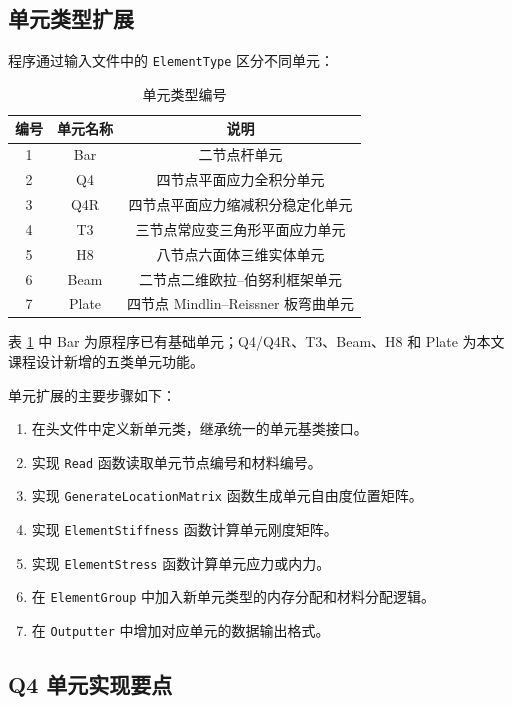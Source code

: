 \documentclass[UTF8,a4paper,zihao=-4]{ctexart}
\begin{document}
\subsection{单元类型扩展}

程序通过输入文件中的 \texttt{ElementType} 区分不同单元：
\begin{table}[H]
    \centering
    \caption{单元类型编号}
    \label{tab:element_types}
    \begin{tabular}{ccc}
        \toprule
        编号 & 单元名称 & 说明\\
        \midrule
        1 & Bar & 二节点杆单元\\
        2 & Q4 & 四节点平面应力全积分单元\\
        3 & Q4R & 四节点平面应力缩减积分稳定化单元\\
        4 & T3 & 三节点常应变三角形平面应力单元\\
        5 & H8 & 八节点六面体三维实体单元\\
        6 & Beam & 二节点二维欧拉--伯努利框架单元\\
        7 & Plate & 四节点 Mindlin--Reissner 板弯曲单元\\
        \bottomrule
    \end{tabular}
\end{table}

表 \ref{tab:element_types} 中 Bar 为原程序已有基础单元；Q4/Q4R、T3、Beam、H8 和 Plate 为本文课程设计新增的五类单元功能。

单元扩展的主要步骤如下：

\begin{enumerate}
    \item 在头文件中定义新单元类，继承统一的单元基类接口。
    \item 实现 \texttt{Read} 函数读取单元节点编号和材料编号。
    \item 实现 \texttt{GenerateLocationMatrix} 函数生成单元自由度位置矩阵。
    \item 实现 \texttt{ElementStiffness} 函数计算单元刚度矩阵。
    \item 实现 \texttt{ElementStress} 函数计算单元应力或内力。
    \item 在 \texttt{ElementGroup} 中加入新单元类型的内存分配和材料分配逻辑。
    \item 在 \texttt{Outputter} 中增加对应单元的数据输出格式。
\end{enumerate}

\subsection{Q4 单元实现要点}
\end{document}
